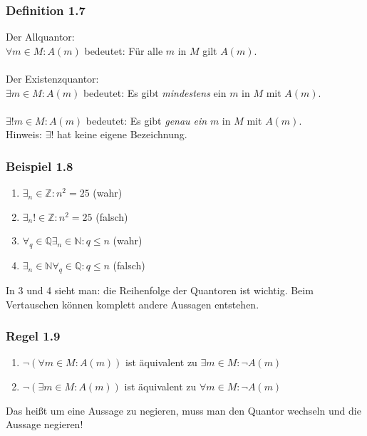\documentclass{article}
\begin{document}
\subsubsection*{Definition 1.7}
Der Allquantor: \\
$\forall m \in M: A(m)$ bedeutet: Für alle $m$ in $M$ gilt $A(m)$. \\
\\
Der Existenzquantor: \\
$\exists m \in M: A(m)$ bedeutet: Es gibt \textit{mindestens} ein $m$ in $M$ mit $A(m)$. \\
\\
$\exists! m \in M: A(m)$ bedeutet: Es gibt \textit{genau ein} $m$ in $M$ mit $A(m)$. \\
Hinweis: $\exists!$ hat keine eigene Bezeichnung. \\

\subsubsection*{Beispiel 1.8}
\begin{enumerate}
    \item $\exists_n \in \mathbb{Z}: n^2 = 25$ (wahr)
    \item $\exists_n! \in \mathbb{Z}: n^2 = 25$ (falsch)
    \item $\forall_q \in \mathbb{Q} \exists_n \in \mathbb{N}: q \leq n$ (wahr)
    \item $\exists_n \in \mathbb{N} \forall_q \in \mathbb{Q}: q \leq n$ (falsch)
\end{enumerate}

In 3 und 4 sieht man: die Reihenfolge der Quantoren ist wichtig. Beim Vertauschen können komplett andere Aussagen entstehen.

\subsubsection*{Regel 1.9}
\begin{enumerate}
    \item $\neg (\forall m \in M: A(m))$ ist äquivalent zu $\exists m \in M: \neg A(m)$
    \item $\neg (\exists m \in M: A(m))$ ist äquivalent zu $\forall m \in M: \neg A(m)$
\end{enumerate}

Das heißt um eine Aussage zu negieren, muss man den Quantor wechseln und die Aussage negieren! 
\end{document}

